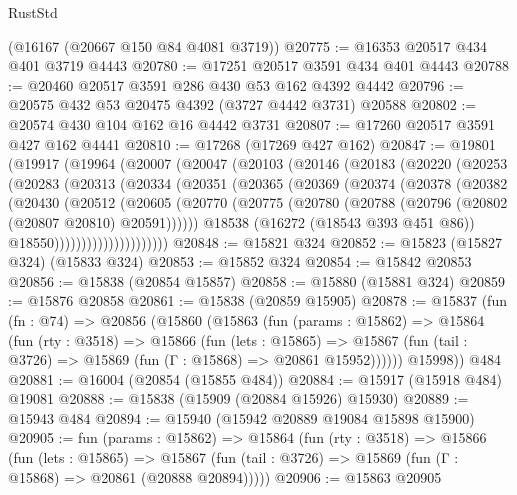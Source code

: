 \begin{lexlean}{RustStd}
\begin{coremodule}
    (@16167 (@20667 @150 @84 @4081 @3719))
@20775 := @16353 @20517 @434 @401 @3719 @4443
@20780 := @17251 @20517 @3591 @434 @401 @4443
@20788 := @20460 @20517 @3591 @286 @430 @53 @162 @4392 @4442
@20796 := @20575 @432 @53 @20475 @4392 (@3727 @4442 @3731) @20588
@20802 := @20574 @430 @104 @162 @16 @4442 @3731
@20807 := @17260 @20517 @3591 @427 @162 @4441
@20810 := @17268 (@17269 @427 @162)
@20847 := @19801
    (@19917
      (@19964
        (@20007
          (@20047
            (@20103
              (@20146
                (@20183
                  (@20220
                    (@20253
                      (@20283
                        (@20313
                          (@20334
                            (@20351
                              (@20365
                                (@20369
                                  (@20374
                                    (@20378
                                      (@20382
                                        (@20430
                                          (@20512
                                            (@20605
                                              (@20770
                                                (@20775
                                                  (@20780
                                                    (@20788
                                                      (@20796 (@20802 (@20807 @20810) @20591))))))
                                              @18538
                                              (@16272 (@18543 @393 @451 @86))
                                              @18550)))))))))))))))))))))
@20848 := @15821 @324
@20852 := @15823 (@15827 @324) (@15833 @324)
@20853 := @15852 @324
@20854 := @15842 @20853
@20856 := @15838 (@20854 @15857)
@20858 := @15880 (@15881 @324)
@20859 := @15876 @20858
@20861 := @15838 (@20859 @15905)
@20878 := @15837
    (fun (fn : @74) =>
    @20856
      (@15860
        (@15863
          (fun (params : @15862) =>
          @15864
            (fun (rty : @3518) =>
            @15866
              (fun (lets : @15865) =>
              @15867 (fun (tail : @3726) => @15869 (fun (Γ : @15868) => @20861 @15952))))))
        @15998))
    @484
@20881 := @16004 (@20854 (@15855 @484))
@20884 := @15917 (@15918 @484) @19081
@20888 := @15838 (@15909 (@20884 @15926) @15930)
@20889 := @15943 @484
@20894 := @15940 (@15942 @20889 @19084 @15898 @15900)
@20905 := fun (params : @15862) =>
  @15864
    (fun (rty : @3518) =>
    @15866
      (fun (lets : @15865) =>
      @15867 (fun (tail : @3726) => @15869 (fun (Γ : @15868) => @20861 (@20888 @20894)))))
@20906 := @15863 @20905

\end{coremodule}
\end{lexlean}

